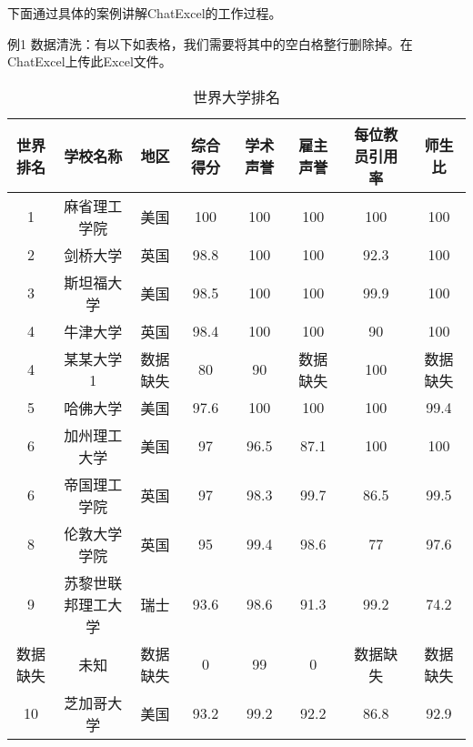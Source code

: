 下面通过具体的案例讲解ChatExcel的工作过程。

例1 数据清洗：有以下如表格，我们需要将其中的空白格整行删除掉。在ChatExcel上传此Excel文件。
\begin{table}[h]
    \centering
    \footnotesize
    \begin{tabular}{cccccccc}
        \toprule
        世界排名 & 学校名称 & 地区 & 综合得分 & 学术声誉 & 雇主声誉 & 每位教员引用率 & 师生比 \\
        \midrule
        1  & 麻省理工学院     & 美国 & 100  & 100  & 100  & 100  & 100  \\
        2  & 剑桥大学         & 英国 & 98.8 & 100  & 100  & 92.3 & 100  \\
        3  & 斯坦福大学       & 美国 & 98.5 & 100  & 100  & 99.9 & 100  \\
        4  & 牛津大学         & 英国 & 98.4 & 100  & 100  & 90   & 100  \\
        4  & 某某大学1        & 数据缺失 & 80   & 90   & 数据缺失 & 100  & 数据缺失 \\
        5  & 哈佛大学         & 美国 & 97.6 & 100  & 100  & 100  & 99.4 \\
        6  & 加州理工大学     & 美国 & 97   & 96.5 & 87.1 & 100  & 100  \\
        6  & 帝国理工学院     & 英国 & 97   & 98.3 & 99.7 & 86.5 & 99.5 \\
        8  & 伦敦大学学院     & 英国 & 95   & 99.4 & 98.6 & 77   & 97.6 \\
        9  & 苏黎世联邦理工大学 & 瑞士 & 93.6 & 98.6 & 91.3 & 99.2 & 74.2 \\
        数据缺失  & 未知             & 数据缺失 & 0    & 99   & 0    & 数据缺失 & 数据缺失 \\
        10 & 芝加哥大学       & 美国 & 93.2 & 99.2 & 92.2 & 86.8 & 92.9 \\
        \bottomrule
    \end{tabular}
    \caption{世界大学排名}
    \label{tab:world_ranking1}
\end{table}
\FloatBarrier





